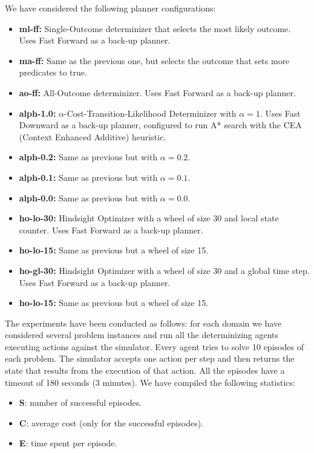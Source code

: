 \documentclass[../root.tex]{subfiles}
\begin{document}
We have considered the following planner configurations:
\begin{itemize}
	\item \textbf{ml-ff:} Single-Outcome determinizer that selects the most likely outcome.
	Uses Fast Forward as a back-up planner.
	\item \textbf{ma-ff:} Same as the previous one, but selects the outcome that sets
	more predicates to true.
	\item \textbf{ao-ff:} All-Outcome determinizer. Uses Fast Forward as a back-up
	planner.
	\item \textbf{alph-1.0:} $ \alpha $-Cost-Transition-Likelihood Determinizer with
	$ \alpha = 1 $. Uses Fast Downward as a back-up planner, configured to run A* search
	with the CEA (Context Enhanced Additive) heuristic.
	\item \textbf{alph-0.2:} Same as previous but with $ \alpha = 0.2 $.
	\item \textbf{alph-0.1:} Same as previous but with $ \alpha = 0.1 $.
	\item \textbf{alph-0.0:} Same as previous but with $ \alpha = 0.0 $.
	\item \textbf{ho-lo-30:} Hindsight Optimizer with a wheel of size 30 and local
	state counter. Uses Fast Forward as a back-up planner.
	\item \textbf{ho-lo-15:} Same as previous but a wheel of size 15.
	\item \textbf{ho-gl-30:} Hindsight Optimizer with a wheel of size 30 and a global
	time step. Uses Fast Forward as a back-up planner.
	\item \textbf{ho-lo-15:} Same as previous but a wheel of size 15.
\end{itemize}

The experiments have been conducted as follows: for each domain we have considered
several problem instances and run all the determinizing agents executing actions
against the simulator. Every agent tries to solve 10 episodes of each problem.
The simulator accepts one action per step and then returns
the state that results from the execution of that action. All the episodes have a timeout
of 180 seconds (3 minutes).
We have compiled the
following statistics:
\begin{itemize}
	\item \textbf{S}: number of successful episodes.
	\item \textbf{C}: average cost (only for the successful episodes).
	\item \textbf{E}: time spent per episode.
\end{itemize}
\end{document}

